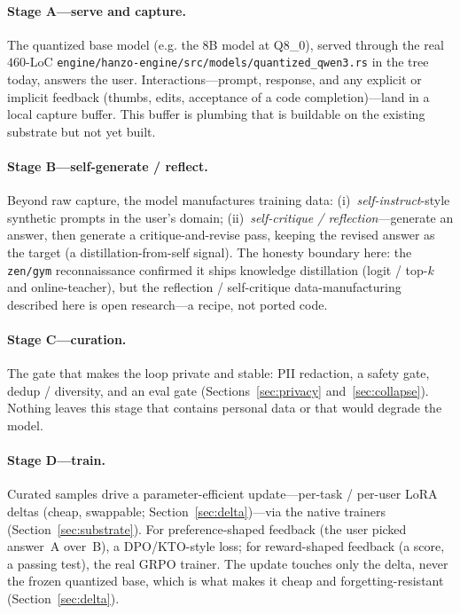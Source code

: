 \documentclass[11pt]{article}
\begin{document}
\paragraph{Stage A---serve and capture.}
The quantized base model (e.g. the 8B model at Q8\_0), served through the real $460$-LoC \texttt{engine/hanzo-engine/src/models/quantized\_qwen3.rs} in the tree today, answers the user. Interactions---prompt, response, and any explicit or implicit feedback (thumbs, edits, acceptance of a code completion)---land in a local capture buffer. This buffer is plumbing that is buildable on the existing substrate but not yet built.

\paragraph{Stage B---self-generate / reflect.}
Beyond raw capture, the model manufactures training data: (i)~\emph{self-instruct}-style synthetic prompts in the user's domain; (ii)~\emph{self-critique / reflection}---generate an answer, then generate a critique-and-revise pass, keeping the revised answer as the target (a distillation-from-self signal). The honesty boundary here: the \texttt{zen/gym} reconnaissance confirmed it ships knowledge distillation (logit / top-$k$ and online-teacher), but the reflection / self-critique data-manufacturing described here is open research---a recipe, not ported code.

\paragraph{Stage C---curation.}
The gate that makes the loop private and stable: PII redaction, a safety gate, dedup / diversity, and an eval gate (Sections~\ref{sec:privacy} and~\ref{sec:collapse}). Nothing leaves this stage that contains personal data or that would degrade the model.

\paragraph{Stage D---train.}
Curated samples drive a parameter-efficient update---per-task / per-user LoRA deltas (cheap, swappable; Section~\ref{sec:delta})---via the native trainers (Section~\ref{sec:substrate}). For preference-shaped feedback (the user picked answer~A over~B), a DPO/KTO-style loss; for reward-shaped feedback (a score, a passing test), the real GRPO trainer. The update touches only the delta, never the frozen quantized base, which is what makes it cheap and forgetting-resistant (Section~\ref{sec:delta}).
\end{document}
